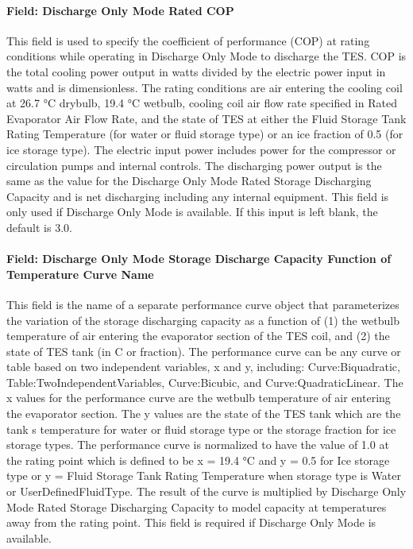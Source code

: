\paragraph{Field: Discharge Only Mode Rated COP}\label{field-discharge-only-mode-rated-cop}

This field is used to specify the coefficient of performance (COP) at rating conditions while operating in Discharge Only Mode to discharge the TES. COP is the total cooling power output in watts divided by the electric power input in watts and is dimensionless. The rating conditions are air entering the cooling coil at 26.7 °C drybulb, 19.4 °C wetbulb, cooling coil air flow rate specified in Rated Evaporator Air Flow Rate, and the state of TES at either the Fluid Storage Tank Rating Temperature (for water or fluid storage type) or an ice fraction of 0.5 (for ice storage type). The electric input power includes power for the compressor or circulation pumps and internal controls. The discharging power output is the same as the value for the Discharge Only Mode Rated Storage Discharging Capacity and is net discharging including any internal equipment. This field is only used if Discharge Only Mode is available. If this input is left blank, the default is 3.0.

\paragraph{Field: Discharge Only Mode Storage Discharge Capacity Function of Temperature Curve Name}\label{field-discharge-only-mode-storage-discharge-capacity-function-of-temperature-curve-name}

This field is the name of a separate performance curve object that parameterizes the variation of the storage discharging capacity as a function of (1) the wetbulb temperature of air entering the evaporator section of the TES coil, and (2) the state of TES tank (in C or fraction). The performance curve can be any curve or table based on two independent variables, x and y, including: Curve:Biquadratic, Table:TwoIndependentVariables, Curve:Bicubic, and Curve:QuadraticLinear. The x values for the performance curve are the wetbulb temperature of air entering the evaporator section. The y values are the state of the TES tank which are the tank s temperature for water or fluid storage type or the storage fraction for ice storage types. The performance curve is normalized to have the value of 1.0 at the rating point which is defined to be x = 19.4 °C and y = 0.5 for Ice storage type or y = Fluid Storage Tank Rating Temperature when storage type is Water or UserDefinedFluidType. The result of the curve is multiplied by Discharge Only Mode Rated Storage Discharging Capacity to model capacity at temperatures away from the rating point. This field is required if Discharge Only Mode is available.

